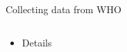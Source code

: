 \documentclass[xcolor=x11names, aspectratio=169, compress]{beamer}
\renewcommand{\(}{\begin{columns}}
\renewcommand{\)}{\end{columns}}
\newcommand{\<}[1]{\begin{column}{#1}}
\renewcommand{\>}{\end{column}}
\begin{document}
\begin{frame}{Collecting data from WHO}
\begin{columns}[T]
  \begin{column}{0.2\textwidth}
    \begin{itemize}[<+->]
       \item[] Details

     \end{itemize}
     \end{column}

    \begin{column}{0.8\textwidth}
    \begin{center}
      \begin{itemize}

\end{itemize}
\end{center}
\end{column}
\end{columns}
\end{frame}
\end{document}
